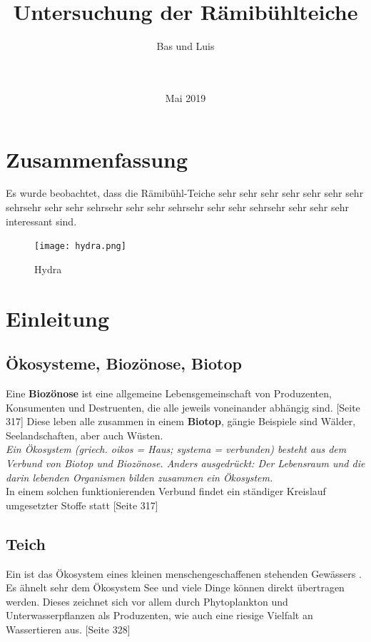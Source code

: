 \documentclass{article}
\title{\Huge{Untersuchung der Rämibühlteiche}}
\author{ \huge{Bas und Luis} \\ \\ \\
         \centering{\texttt{[image: Teichtitelbild.JPG]}}}
\date{Mai 2019}
\begin{document}
\maketitle

\newpage


\centering \section{Zusammenfassung}
Es wurde beobachtet, dass die Rämibühl-Teiche sehr sehr sehr sehr sehr sehr sehr sehrsehr sehr sehr sehrsehr sehr sehr sehrsehr sehr sehr sehrsehr sehr sehr sehr interessant sind.

\begin{figure}[h!]
\centering
\texttt{[image: hydra.png]}
\caption{Hydra}
\label{fig:universe}
\end{figure}

\section{Einleitung}

    \subsection{Ökosysteme, Biozönose, Biotop}
        
        Eine \textbf{Biozönose} ist eine allgemeine Lebensgemeinschaft von Produzenten, Konsumenten und Destruenten, die alle jeweils voneinander abhängig sind. \cite{Biobuch}[Seite 317]
        Diese leben alle zusammen in einem \textbf{Biotop}, gängie Beispiele sind Wälder, Seelandschaften, aber auch Wüsten. \\
        \vspace{5mm}
        \textit{
        Ein Ökosystem (griech. oikos = Haus; systema = verbunden) besteht aus dem Verbund von Biotop und Biozönose. Anders ausgedrückt: Der Lebensraum und die darin lebenden Organismen bilden zusammen ein Ökosystem. \cite{Biologie-schule.de} } \\
        
        In einem solchen funktionierenden Verbund findet ein ständiger Kreislauf umgesetzter Stoffe statt \cite{Biobuch} [Seite 317]
        
    \subsection{Teich}
    
       Ein  ist das Ökosystem eines kleinen menschengeschaffenen stehenden Gewässers \cite{Duden}. Es ähnelt sehr dem Ökosystem See und viele Dinge können direkt übertragen werden. \cite{Kleingewasserkunde} Dieses zeichnet sich vor allem durch Phytoplankton und Unterwasserpflanzen als Produzenten, wie auch eine riesige Vielfalt an Wassertieren aus. \cite{Biobuch} [Seite 328]
    
\end{document}
